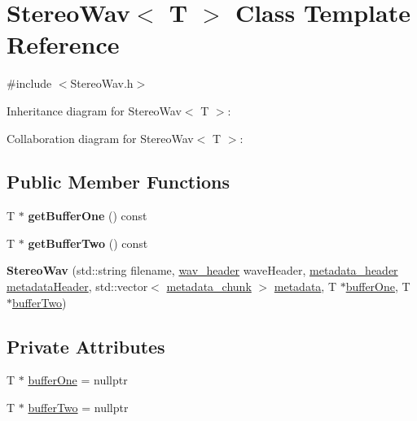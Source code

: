 \hypertarget{classStereoWav}{}\section{Stereo\+Wav$<$ T $>$ Class Template Reference}
\label{classStereoWav}


{\ttfamily \#include $<$Stereo\+Wav.\+h$>$}



Inheritance diagram for Stereo\+Wav$<$ T $>$\+:


Collaboration diagram for Stereo\+Wav$<$ T $>$\+:
\subsection*{Public Member Functions}
\begin{DoxyCompactItemize}
\item 
\mbox{\label{classStereoWav_a178f2d76041b8020bb14667fc7c696d1}} 
T $\ast$ {\bfseries get\+Buffer\+One} () const
\item 
\mbox{\label{classStereoWav_a993bdd3eb575890106810fe541e73476}} 
T $\ast$ {\bfseries get\+Buffer\+Two} () const
\item 
\mbox{\label{classStereoWav_ae45852ed5c2722ce77b797e9ae30f9b5}} 
{\bfseries Stereo\+Wav} (std\+::string filename, \hyperlink{structwav__header}{wav\+\_\+header} wave\+Header, \hyperlink{structmetadata__header}{metadata\+\_\+header} \hyperlink{classWav_a4ddb72dc81101f50ef1f6c4d0e8dc257}{metadata\+Header}, std\+::vector$<$ \hyperlink{structmetadata__chunk}{metadata\+\_\+chunk} $>$ \hyperlink{classWav_a69b39a8dd2ddd962b6acb966e0f454ee}{metadata}, T $\ast$\hyperlink{classStereoWav_a6d66822cb86640adf89bf62fcbbeb563}{buffer\+One}, T $\ast$\hyperlink{classStereoWav_a8235e3a3cc12840a549f2de9d74de35e}{buffer\+Two})
\end{DoxyCompactItemize}
\subsection*{Private Attributes}
\begin{DoxyCompactItemize}
\item 
T $\ast$ \hyperlink{classStereoWav_a6d66822cb86640adf89bf62fcbbeb563}{buffer\+One} = nullptr
\item 
T $\ast$ \hyperlink{classStereoWav_a8235e3a3cc12840a549f2de9d74de35e}{buffer\+Two} = nullptr
\end{DoxyCompactItemize}
